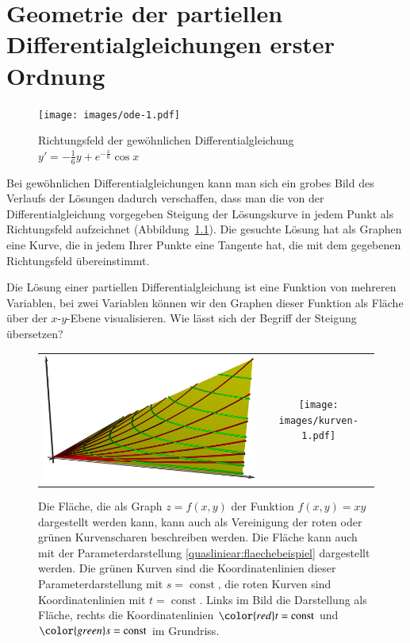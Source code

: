 %
%
%
\chapter{Geometrie der partiellen Differentialgleichungen erster Ordnung\label{chapter-geometrie}}
\begin{figure}
\begin{center}
\texttt{[image: images/ode-1.pdf]}
\end{center}
\caption{Richtungsfeld der gewöhnlichen Differentialgleichung
$y'=-\frac16y+e^{-\frac{x}6}\cos x$ \label{geometrie:ode}}
\end{figure}
Bei gewöhnlichen Differentialgleichungen kann man sich ein grobes
Bild des Verlaufs der Lösungen dadurch verschaffen, dass man
die von der Differentialgleichung vorgegeben Steigung der Lösungskurve
in jedem Punkt als Richtungsfeld aufzeichnet (Abbildung~\ref{geometrie:ode}).
Die gesuchte Lösung hat als Graphen eine Kurve, die in jedem Ihrer Punkte eine
Tangente hat, die mit dem gegebenen Richtungsfeld übereinstimmt.

Die Lösung einer
partiellen Differentialgleichung ist eine Funktion von mehreren Variablen,
bei zwei Variablen können wir den Graphen dieser Funktion als Fläche
über der $x$-$y$-Ebene visualisieren. Wie lässt sich der Begriff der
Steigung übersetzen?

\begin{figure}
\centering
\begin{tabular}{cc}
\includegraphics[width=0.6\hsize]{3d/surface.jpg}&%
\texttt{[image: images/kurven-1.pdf]}
\end{tabular}
\caption{Die Fläche, die als Graph $z=f(x,y)$ der Funktion $f(x,y)=xy$ 
dargestellt werden kann, kann auch als Vereinigung der roten oder grünen
Kurvenscharen beschreiben werden.
Die Fläche kann auch mit der Parameterdarstellung
\eqref{quasliniear:flaechebeispiel}
dargestellt werden.
Die grünen Kurven sind die Koordinatenlinien dieser Parameterdarstellung
mit $s=\operatorname{const}$,
die roten Kurven sind Koordinatenlinien mit $t=\operatorname{const}$.
Links im Bild die Darstellung als Fläche, rechts die Koordinatenlinien
${\color{red}t}=\operatorname{const}$
und
${\color{green}s}=\operatorname{const}$
im Grundriss.
\label{quasilinear:flaechenalskurven}
}
\end{figure}


